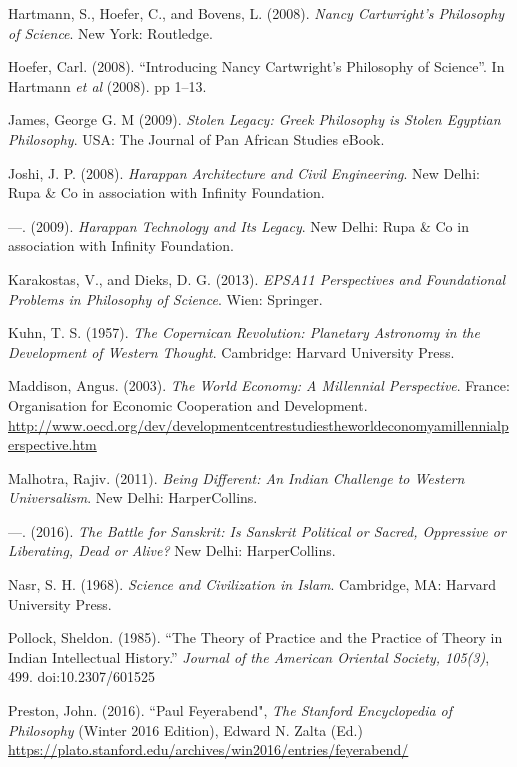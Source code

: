 \begin{thebibliography}{99}
  Hartmann, S., Hoefer, C., and Bovens, L. (2008). \textit{Nancy Cartwright's Philosophy of Science}. New York: Routledge.

  Hoefer, Carl. (2008). “Introducing Nancy Cartwright’s Philosophy of Science”. In Hartmann \textit{et al} (2008). pp 1–13.

  James, George G. M (2009). \textit{Stolen Legacy: Greek Philosophy is Stolen Egyptian Philosophy}. USA: The Journal of Pan African Studies eBook.

  Joshi, J. P. (2008). \textit{Harappan Architecture and Civil Engineering}. New Delhi: Rupa \& Co in association with Infinity Foundation.

  —. (2009). \textit{Harappan Technology and Its Legacy}. New Delhi: Rupa \& Co in association with Infinity Foundation.

  Karakostas, V., and Dieks, D. G. (2013). \textit{EPSA11 Perspectives and Foundational Problems in Philosophy of Science}. Wien: Springer.

  Kuhn, T. S. (1957). \textit{The Copernican Revolution: Planetary Astronomy in the Development of Western Thought}. Cambridge: Harvard University Press.

  Maddison, Angus. (2003). \textit{The World Economy: A Millennial Perspective}. France: Organisation for Economic Cooperation and Development. \url{http://www.oecd.org/dev/developmentcentrestudiestheworldeconomyamillennialperspective.htm}

  Malhotra, Rajiv. (2011). \textit{Being Different: An Indian Challenge to Western Universalism}. New Delhi: HarperCollins.

  —. (2016). \textit{The Battle for Sanskrit: Is Sanskrit Political or Sacred, Oppressive or Liberating, Dead or Alive?} New Delhi: HarperCollins.

  Nasr, S. H. (1968). \textit{Science and Civilization in Islam}. Cambridge, MA: Harvard University Press.

  Pollock, Sheldon. (1985). “The Theory of Practice and the Practice of Theory in Indian Intellectual History.” \textit{Journal of the American Oriental Society, 105(3)}, 499. doi:10.2307/601525

  Preston, John. (2016). “Paul Feyerabend", \textit{The Stanford Encyclopedia of Philosophy} (Winter 2016 Edition), Edward N. Zalta (Ed.) \url{https://plato.stanford.edu/archives/win2016/entries/feyerabend/}


\end{thebibliography}

